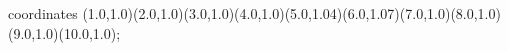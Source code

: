 					coordinates { (1.0,1.0)(2.0,1.0)(3.0,1.0)(4.0,1.0)(5.0,1.04)(6.0,1.07)(7.0,1.0)(8.0,1.0)(9.0,1.0)(10.0,1.0)};